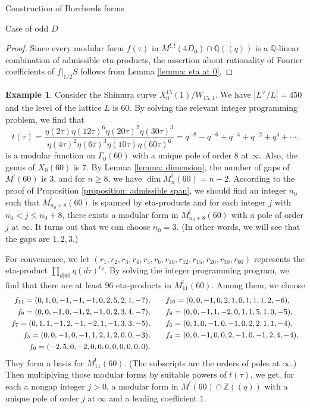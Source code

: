 \documentclass{amsart}
\newcounter{lemma}
\theoremstyle{definition}
\newtheorem{Example}[lemma]{Example}
\def\Q{\mathbb Q}
\def\Z{\mathbb Z}
\begin{document}
\begin{section}{Construction of Borcherds forms}
\begin{subsection}{Case of odd $D$}
\begin{proof}
  Since every modular form $f(\tau)$ in $M^{!,!}(4D_0)\cap\Q((q))$ is
  a $\Q$-linear combination of admissible eta-products, the assertion
  about rationality of Fourier coefficients of $f|_{1/2}S$ follows
  from Lemma \ref{lemma: eta at 0}.
\end{proof}

\begin{Example} \label{example: 15}
Consider the Shimura curve $X^{15}_0(1)/W_{15,1}$. We
  have $|L^\vee/L|=450$ and the level of the lattice $L$ is
  $60$. By solving the relevant integer programming problem, we find that
  \begin{equation*}
    t(\tau)=\frac{\eta(2\tau)\eta(12\tau)^6\eta(20\tau)^2\eta(30\tau)^3}
    {\eta(4\tau)^2\eta(6\tau)^3\eta(10\tau)\eta(60\tau)^6}
   =q^{-8}-q^{-6}+q^{-4}+q^{-2}+q^{4}+\cdots.
  \end{equation*}
  is a modular function on $\Gamma_0(60)$ with a unique pole of order
  $8$ at $\infty$. Also, the genus of $X_0(60)$ is $7$. By Lemma
  \ref{lemma: dimension}, the number of gaps of $M^!(60)$ is $3$, and
  for $n\ge 8$, we have $\dim M_n^!(60)=n-2$. According to the proof
  of Proposition \ref{proposition: admissible span}, we should find an
  integer $n_0$ such that $M^!_{n_0+8}(60)$ is spanned by eta-products
  and for each integer $j$ with $n_0<j\le n_0+8$, there exists a
  modular form in $M^!_{n_0+8}(60)$ with a pole of order $j$ at
  $\infty$. It turns out that we can choose $n_0=3$. (In other words,
  we will see that the gaps are $1,2,3$.)

  For convenience, we let
  $(r_1,r_2,r_3,r_4,r_5,r_6,r_{10},r_{12},r_{15},r_{20},r_{30},r_{60})$
  represents the eta-product $\prod_{d|60}\eta(d\tau)^{r_d}$. By
  solving the integer programming program, we find that there are at
  least $96$ eta-products in $M_{11}^!(60)$. Among them, we choose
  \begin{equation*} \small
  \begin{split}
  f_{11}=(0, 1, 0, -1, -1, -1, 0, 2, 5, 2, 1, -7), 
  &\qquad f_{10}=(0, 0, -1, 0, 2, 1, 0, 1, 1, 1, 2, -6), \\
  f_9=(0, 0, -1, 0, -1, 2, -1, 0, 2, 3, 4, -7),
  &\qquad f_8=(0, 0, -1, 1, -2, 0, 1, 1, 5, 1, 0, -5), \\
  f_7=(0, 1, 1, -1, 2, -1, -2, 1, -1, 3, 3, -5),
  &\qquad f_6=(0, 1, 0, -1, 0, -1, 0, 2, 2, 1, 1, -4), \\
  f_5=(0, 0, -1, 0, -1, 1, 2, 1, 2, 0, 0, -3),
  &\qquad f_4=(0, 0, -1, 0, 0, 2, -1, 0, -1, 2, 4, -4), \\
  f_0=(-2, 5, 0, -2, 0, 0, 0, 0, 0, 0, 0, 0). &
  \end{split}
  \end{equation*}
  They form a basis for $M^!_{11}(60)$. (The subscripts are the orders of
  poles at $\infty$.) Then multiplying those modular forms by suitable
  powers of $t(\tau)$, we get, for each a nongap integer $j>0$, a
  modular form in $M^!(60)\cap\Z((q))$ with a unique pole of order $j$
  at $\infty$ and a leading coefficient $1$.


\end{Example}
\end{subsection}
\end{section}
\end{document}
